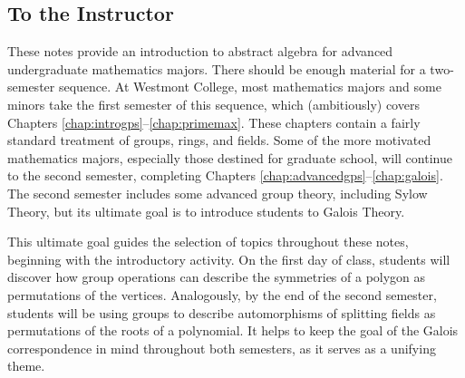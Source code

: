 \tableofcontents


\begin{annotation}
 \chapter{To the Instructor}

These notes provide an introduction to abstract algebra for advanced undergraduate mathematics majors. There should be enough material for a two-semester sequence. At Westmont College, most mathematics majors and some minors take the first semester of this sequence, which (ambitiously) covers Chapters \ref{chap:introgps}--\ref{chap:primemax}. These chapters contain a fairly standard treatment of groups, rings, and fields. Some of the more motivated mathematics majors, especially those destined for graduate school, will continue to the second semester, completing Chapters \ref{chap:advancedgps}--\ref{chap:galois}. The second semester includes some advanced group theory, including Sylow Theory, but its ultimate goal is to introduce students to Galois Theory.

This ultimate goal guides the selection of topics throughout these notes, beginning with the introductory activity. On the first day of class, students will discover how group operations can describe the symmetries of a polygon as permutations of the vertices. Analogously, by the end of the second semester, students will be using groups to describe automorphisms of splitting fields as permutations of the roots of a polynomial. It helps to keep the goal of the Galois correspondence in mind throughout both semesters, as it serves as a unifying theme.


\end{annotation}
